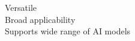 \documentclass[preview]{standalone}
\begin{document}
Versatile\\Broad applicability\\Supports wide range of AI models\\
\end{document}
